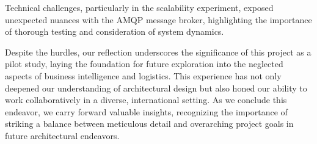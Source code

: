 \documentclass[conference]{IEEEtran}
\begin{document}
Technical challenges, particularly in the scalability experiment, exposed unexpected nuances with the AMQP message broker, highlighting the importance of thorough testing and consideration of system dynamics.

Despite the hurdles, our reflection underscores the significance of this project as a pilot study, laying the foundation for future exploration into the neglected aspects of business intelligence and logistics. This experience has not only deepened our understanding of architectural design but also honed our ability to work collaboratively in a diverse, international setting. As we conclude this endeavor, we carry forward valuable insights, recognizing the importance of striking a balance between meticulous detail and overarching project goals in future architectural endeavors.



\vspace{12pt}
\end{document}
